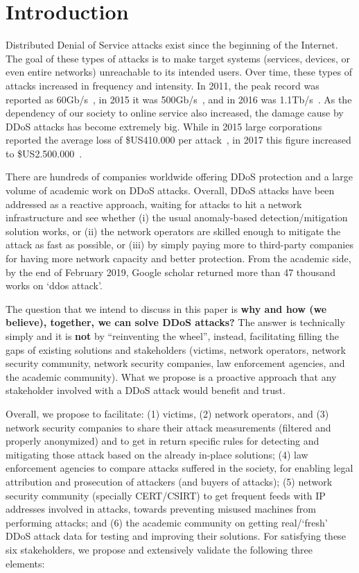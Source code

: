 \section{Introduction}
\label{introduction}

Distributed Denial of Service attacks exist since the beginning of the Internet. The goal of these types of attacks is to make target systems (services, devices, or even entire networks) unreachable to its intended users. Over time, these types of attacks increased in frequency and intensity. In 2011, the peak record was reported as 60Gb/s~\cite{}, in 2015 it was 500Gb/s~\cite{}, and in 2016 was 1.1Tb/s~\cite{}. As the dependency of our society to online service also increased, the damage cause by DDoS attacks has become extremely big.  While in 2015 large corporations reported the average loss of \$US410.000 per attack~\cite{}, in 2017 this figure increased to \$US2.500.000~\cite{}.

There are hundreds of companies worldwide offering DDoS protection and a large volume of academic work on DDoS attacks. Overall, DDoS attacks have been addressed as a reactive approach, waiting for attacks to hit a network infrastructure and see whether (i) the usual anomaly-based detection/mitigation solution works, or (ii) the network operators are skilled enough to mitigate the attack as fast as possible, or (iii) by simply paying more to third-party companies for having more network capacity and better protection. From the academic side, by the end of February 2019, Google scholar returned more than 47 thousand works on ‘ddos attack’. 

The question that we intend to discuss in this paper is \textbf{why and how (we believe), together, we can solve DDoS attacks?} The answer is technically simply and it is \textbf{not} by ``reinventing the wheel'', instead, facilitating filling the gaps of existing solutions and stakeholders (\eg victims, network operators, network security community, network security companies, law enforcement agencies, and the academic community). What we propose is a proactive approach that any stakeholder involved with a DDoS attack would benefit and trust.

Overall, we propose to facilitate: (1) victims, (2) network operators, and (3) network security companies to share their attack measurements (filtered and properly anonymized) and to get in return specific rules for detecting and mitigating those attack based on the already in-place solutions; (4) law enforcement agencies to compare attacks suffered in the society, for enabling legal attribution and prosecution of attackers (and buyers of attacks); (5) network security community (specially CERT/CSIRT) to get frequent feeds with IP addresses involved in attacks, towards preventing misused machines from performing attacks; and (6) the academic community on getting real/`fresh' DDoS attack data for testing and improving their solutions. For satisfying these six stakeholders, we propose and extensively validate the following three elements: 

